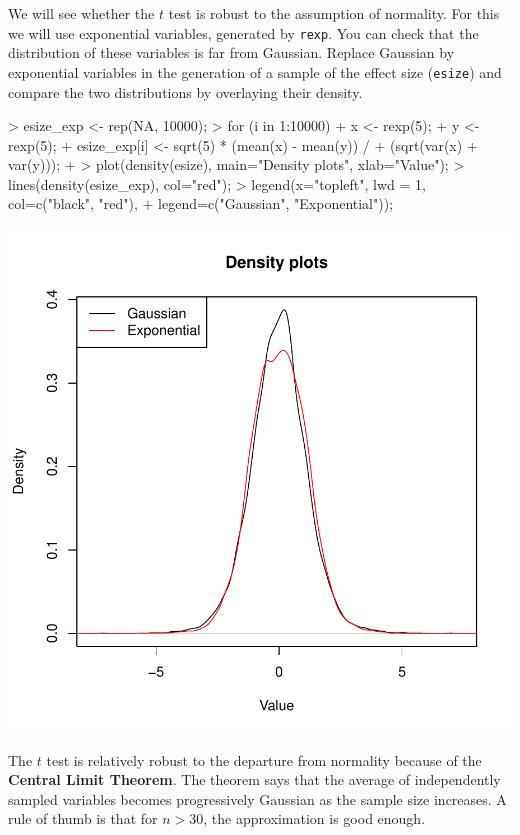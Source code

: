 \documentclass[a4paper]{article}
\theoremstyle{definition}
\begin{document}
\begin{Exercise}
We will see whether the $t$ test is robust to the assumption of
normality. For this we will use exponential variables, generated
by \texttt{rexp}. You can check that the distribution of these
variables is far from Gaussian. Replace Gaussian by exponential
variables in the generation of a sample of the effect size
(\texttt{esize}) and compare the two distributions by overlaying
their density.
\end{Exercise}
\begin{Answer}
\begin{Schunk}
\begin{Sinput}
> esize_exp <- rep(NA, 10000);
> for (i in 1:10000) {
+    x <- rexp(5);
+    y <- rexp(5);
+    esize_exp[i] <- sqrt(5) * (mean(x) - mean(y)) /
+       (sqrt(var(x) + var(y)));
+ }
> plot(density(esize), main="Density plots", xlab="Value");
> lines(density(esize_exp), col="red");
> legend(x="topleft", lwd = 1, col=c("black", "red"),
+    legend=c("Gaussian", "Exponential"));
\end{Sinput}
\end{Schunk}
\includegraphics{ttest-016}
\par
The $t$ test is relatively robust to the departure from normality
because of the \textbf{Central Limit Theorem}. The theorem says
that the average of independently sampled variables becomes
progressively Gaussian as the sample size increases. A rule of
thumb is that for $n>30$, the approximation is good enough.
\end{Answer}

\cleardoublepage
\shipoutAnswer
\end{document}
